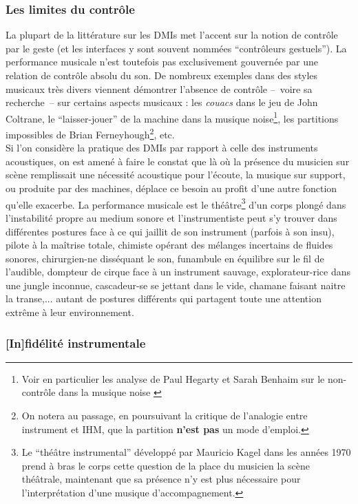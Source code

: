\subsubsection{Les limites du contrôle}

\noindent La plupart de la littérature sur les \glspl{DMI} met l'accent sur la notion de contrôle par le geste (et les interfaces y sont souvent nommées ``contrôleurs gestuels''). La performance musicale n'est toutefois pas exclusivement gouvernée par une relation de contrôle absolu du son. De nombreux exemples dans des styles musicaux très divers viennent démontrer l'absence de contrôle --~voire sa recherche~-- sur certains aspects musicaux : les \textit{couacs} dans le jeu de John Coltrane, le ``laisser-jouer'' de la machine dans la musique noise\footnote{Voir en particulier les analyse de Paul Hegarty et Sarah Benhaim sur le non-contrôle dans la musique noise \cite{hegarty_noise_2007, benhaim_aux_2018}}, les partitions impossibles de Brian Ferneyhough\footnote{On notera au passage, en poursuivant la critique de l'analogie entre instrument et \gls{IHM}, que la partition \textbf{n'est pas} un mode d'emploi.}, etc.\\
\indent Si l'on considère la pratique des \glspl{DMI} par rapport à celle des instruments acoustiques, on est amené à faire le constat que là où la présence du musicien sur scène remplissait une nécessité acoustique pour l’écoute, la musique sur support, ou produite par des machines, déplace ce besoin au profit d’une autre fonction qu'elle exacerbe. La performance musicale est le théâtre\footnote{Le ``théâtre instrumental'' développé par Mauricio Kagel dans les années 1970 prend à bras le corps cette question de la place du musicien la scène théâtrale, maintenant que sa présence n'y est plus nécessaire pour l'interprétation d'une musique d'accompagnement.} d'un corps plongé dans l'instabilité propre au medium sonore et l'instrumentiste peut s'y trouver dans différentes postures face à ce qui jaillit de son instrument (parfois à son insu), pilote à la maîtrise totale, chimiste opérant des mélanges incertains de fluides sonores, chirurgien-ne disséquant le son, funambule en équilibre sur le fil de l'audible, dompteur de cirque face à un instrument sauvage, explorateur-rice dans une jungle inconnue, cascadeur-se se jettant dans le vide, chamane faisant naitre la transe,... autant de postures différents qui partagent toute une attention extrême à leur environnement.

\subsubsection{[In]fidélité instrumentale}

